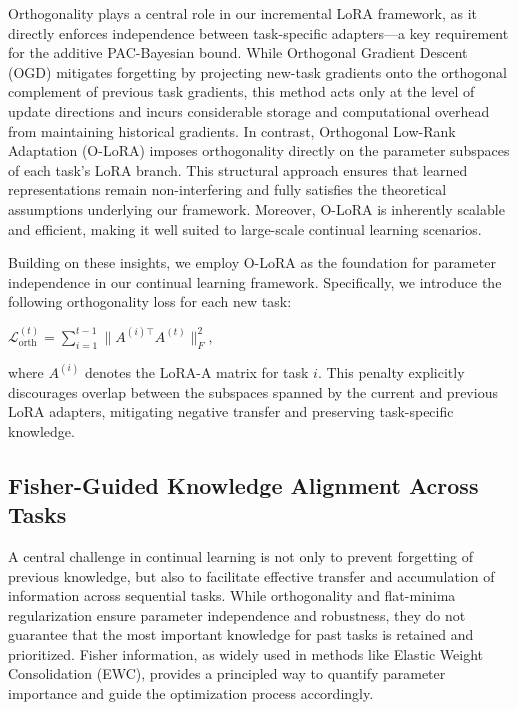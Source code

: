 \documentclass[letterpaper]{article} %
\begin{document}
Orthogonality plays a central role in our incremental LoRA framework, as it directly enforces independence between task-specific adapters—a key requirement for the additive PAC-Bayesian bound. While Orthogonal Gradient Descent (OGD) mitigates forgetting by projecting new-task gradients onto the orthogonal complement of previous task gradients, this method acts only at the level of update directions and incurs considerable storage and computational overhead from maintaining historical gradients. In contrast, Orthogonal Low-Rank Adaptation (O-LoRA) imposes orthogonality directly on the parameter subspaces of each task’s LoRA branch. This structural approach ensures that learned representations remain non-interfering and fully satisfies the theoretical assumptions underlying our framework. Moreover, O-LoRA is inherently scalable and efficient, making it well suited to large-scale continual learning scenarios.


Building on these insights, we employ O-LoRA as the foundation for parameter independence in our continual learning framework. Specifically, we introduce the following orthogonality loss for each new task:

$\mathcal{L}_{\text{orth}}^{(t)} = \sum_{i=1}^{t-1} \|A^{(i)\top} A^{(t)}\|_F^2,$

where $A^{(i)}$ denotes the LoRA-A matrix for task $i$. This penalty explicitly discourages overlap between the subspaces spanned by the current and previous LoRA adapters, mitigating negative transfer and preserving task-specific knowledge.



\subsection{Fisher-Guided Knowledge Alignment Across Tasks}



A central challenge in continual learning is not only to prevent forgetting of previous knowledge, but also to facilitate effective transfer and accumulation of information across sequential tasks. While orthogonality and flat-minima regularization ensure parameter independence and robustness, they do not guarantee that the most important knowledge for past tasks is retained and prioritized. Fisher information, as widely used in methods like Elastic Weight Consolidation (EWC), provides a principled way to quantify parameter importance and guide the optimization process accordingly.
\end{document}
